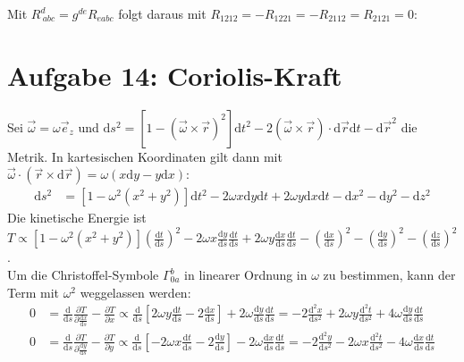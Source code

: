 \documentclass[a4paper,12pt]{article}
\newcommand{\kla}{}
\newcommand{\klam}{}
\newcommand{\tecxt}{}
\begin{document}
Mit $R^d_{\ abc}=g^{de}R_{eabc}$ folgt daraus mit $R_{1212}=-R_{1221}=-R_{2112}=R_{2121}=0$:
\section*{Aufgabe 14: Coriolis-Kraft}
Sei $\vec{\omega}=\omega\vec{e}_z$ und $\tecxt\text{d}s^2=\klam\left[ {1-(\vec{\omega}\times\vec{r})^2} \right]\tecxt\text{d}t^2-2(\vec{\omega}\times\vec{r})\cdot\tecxt\text{d}\vec{r}\tecxt\text{d}t-\tecxt\text{d}\vec{r}^2$ die Metrik. In kartesischen Koordinaten gilt dann mit $\vec{\omega}\cdot (\vec{r}\times\tecxt\text{d}\vec{r})=\omega (x\tecxt\text{d}y-y\tecxt\text{d}x)$:
\begin{align*}
\tecxt\text{d}s^2&=\klam\left[ {1-\omega^2(x^2+y^2)} \right]\tecxt\text{d}t^2-2\omega x\tecxt\text{d}y \tecxt\text{d}t +2\omega y\tecxt\text{d}x\tecxt\text{d}t-\tecxt\text{d}x^2-\tecxt\text{d}y^2-\tecxt\text{d}z^2
\end{align*}
Die kinetische Energie ist $T\propto \klam\left[ {1-\omega^2(x^2+y^2)} \right]\kla\left( {\frac{\tecxt\text{d}t}{\tecxt\text{d}s}} \right)^2-2\omega x\frac{\tecxt\text{d}y}{\tecxt\text{d}s} \frac{\tecxt\text{d}t}{\tecxt\text{d}s} + 2\omega y\frac{\tecxt\text{d}x}{\tecxt\text{d}s}\frac{\tecxt\text{d}t}{\tecxt\text{d}s}-\kla\left( {\frac{\tecxt\text{d}x}{\tecxt\text{d}s}} \right)^2-\kla\left( {\frac{\tecxt\text{d}y}{\tecxt\text{d}s}} \right)^2-\kla\left( {\frac{\tecxt\text{d}z}{\tecxt\text{d}s}} \right)^2$.\\
Um die Christoffel-Symbole $\Gamma^b_{0a}$ in linearer Ordnung in $\omega$ zu bestimmen, kann der Term mit $\omega^2$ weggelassen werden:
\begin{align*}
0&=\frac{\tecxt\text{d}}{\tecxt\text{d}s}\frac{\partial T}{\partial \frac{\tecxt\text{d}x}{\tecxt\text{d}s}}-\frac{\partial T}{\partial x}\propto \frac{\tecxt\text{d}}{\tecxt\text{d}s}\klam\left[ {2\omega y\frac{\tecxt\text{d}t}{\tecxt\text{d}s} - 2\frac{\tecxt\text{d}x}{\tecxt\text{d}s}} \right]+2\omega\frac{\tecxt\text{d}y}{\tecxt\text{d}s}\frac{\tecxt\text{d}t}{\tecxt\text{d}s}=-2\frac{\tecxt\text{d}^2x}{\tecxt\text{d}s^2} + 2\omega y\frac{\tecxt\text{d}^2t}{\tecxt\text{d}s^2}+4\omega\frac{\tecxt\text{d}y}{\tecxt\text{d}s}\frac{\tecxt\text{d}t}{\tecxt\text{d}s}  \\
0&=\frac{\tecxt\text{d}}{\tecxt\text{d}s}\frac{\partial T}{\partial \frac{\tecxt\text{d}y}{\tecxt\text{d}s}}-\frac{\partial T}{\partial y}\propto \frac{\tecxt\text{d}}{\tecxt\text{d}s}\klam\left[ {-2\omega x\frac{\tecxt\text{d}t}{\tecxt\text{d}s} - 2\frac{\tecxt\text{d}y}{\tecxt\text{d}s}} \right] - 2\omega\frac{\tecxt\text{d}x}{\tecxt\text{d}s}\frac{\tecxt\text{d}t}{\tecxt\text{d}s} = -2\frac{\tecxt\text{d}^2y}{\tecxt\text{d}s^2} - 2\omega x\frac{\tecxt\text{d}^2t}{\tecxt\text{d}s^2}-4\omega\frac{\tecxt\text{d}x}{\tecxt\text{d}s}\frac{\tecxt\text{d}t}{\tecxt\text{d}s}  
\end{align*}
\end{document}
